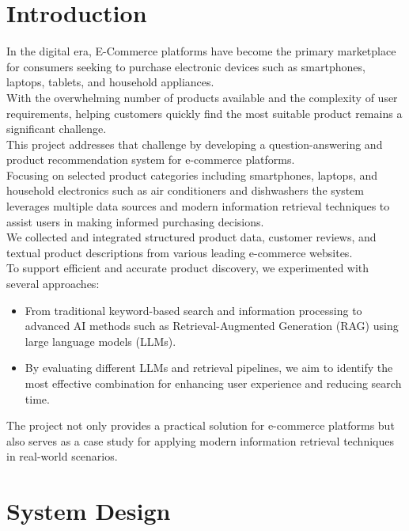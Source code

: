 \documentclass{article}
\begin{document}
\section{Introduction}
\hspace{0.5cm}In the digital era, E-Commerce platforms have become the primary marketplace for consumers seeking to purchase electronic devices such as smartphones, laptops, tablets, and household appliances.
\vspace{0.3cm}\\
With the overwhelming number of products available and the complexity of user requirements, helping customers quickly find the most suitable product remains a significant challenge.
\vspace{0.3cm}\\
This project addresses that challenge by developing a question-answering and product recommendation system for e-commerce platforms.
\vspace{0.3cm}\\
Focusing on selected product categories including smartphones, laptops, and household electronics such as air conditioners and dishwashers the system leverages multiple data sources and modern information retrieval techniques to assist users in making informed purchasing decisions.
\vspace{0.3cm}\\
We collected and integrated structured product data, customer reviews, and textual product descriptions from various leading e-commerce websites.
\vspace{0.3cm}\\
To support efficient and accurate product discovery, we experimented with several approaches:
\begin{itemize}
    \item From traditional keyword-based search and information processing to advanced AI methods such as Retrieval-Augmented Generation (RAG) using large language models (LLMs).
    \item By evaluating different LLMs and retrieval pipelines, we aim to identify the most effective combination for enhancing user experience and reducing search time.
\end{itemize}
The project not only provides a practical solution for e-commerce platforms but also serves as a case study for applying modern information retrieval techniques in real-world scenarios.

\newpage
\section{System Design}
\end{document}
